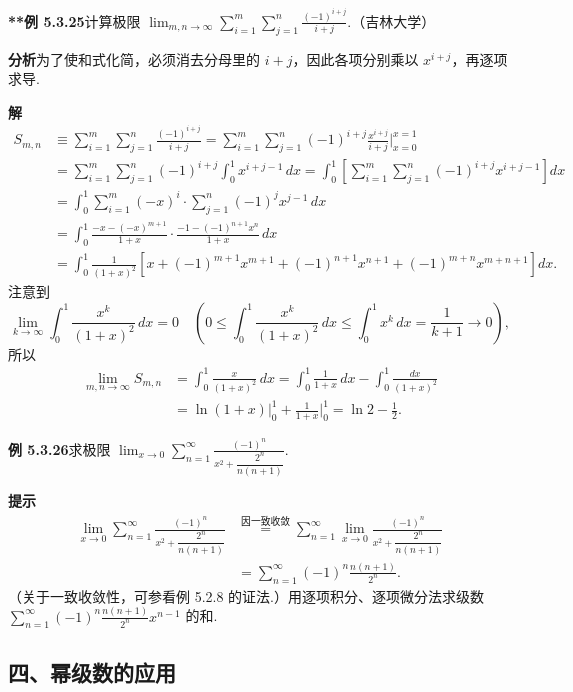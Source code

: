 \documentclass[UTF8, 12pt, fontset=fandol, oneside]{ctexart}
\begin{document}
\noindent\textbf{**例 5.3.25}\quad 计算极限
$\displaystyle\lim_{m,n\to\infty}\sum_{i=1}^m\sum_{j=1}^n\frac{(-1)^{i+j}}{i+j}$.（吉林大学）

\noindent\textbf{分析}\quad 为了使和式化简，必须消去分母里的 $i+j$，因此各项分别乘以 $x^{i+j}$，再逐项求导.

\noindent\textbf{解}\quad
\[
\begin{aligned}
S_{m,n}
&\equiv\sum_{i=1}^m\sum_{j=1}^n\frac{(-1)^{i+j}}{i+j}
=\sum_{i=1}^m\sum_{j=1}^n(-1)^{i+j}\frac{x^{i+j}}{i+j}\bigg|_{x=0}^{x=1}\\
&=\sum_{i=1}^m\sum_{j=1}^n(-1)^{i+j}\int_0^1 x^{i+j-1}\,dx
=\int_0^1\left[\sum_{i=1}^m\sum_{j=1}^n(-1)^{i+j}x^{i+j-1}\right]dx\\
&=\int_0^1\sum_{i=1}^m(-x)^i\cdot\sum_{j=1}^n(-1)^jx^{j-1}\,dx\\
&=\int_0^1\frac{-x-(-x)^{m+1}}{1+x}\cdot\frac{-1-(-1)^{n+1}x^n}{1+x}\,dx\\
&=\int_0^1\frac1{(1+x)^2}\left[x+(-1)^{m+1}x^{m+1}
+(-1)^{n+1}x^{n+1}+(-1)^{m+n}x^{m+n+1}\right]dx.
\end{aligned}
\]
注意到
\[
  \lim_{k\to\infty}\int_0^1\frac{x^k}{(1+x)^2}\,dx=0
  \quad\left(0\le\int_0^1\frac{x^k}{(1+x)^2}\,dx\le\int_0^1x^k\,dx=\frac1{k+1}\to0\right),
\]
所以
\[
\begin{aligned}
\lim_{m,n\to\infty}S_{m,n}
&=\int_0^1\frac{x}{(1+x)^2}\,dx
=\int_0^1\frac1{1+x}\,dx-\int_0^1\frac{dx}{(1+x)^2}\\
&=\ln(1+x)\bigg|_0^1+\frac1{1+x}\bigg|_0^1
=\ln2-\frac12.
\end{aligned}
\]

\noindent\textbf{例 5.3.26}\quad 求极限
$\displaystyle\lim_{x\to0}\sum_{n=1}^{\infty}\frac{(-1)^n}{x^2+\dfrac{2^n}{n(n+1)}}$.

\noindent\textbf{提示}\quad
\[
\begin{aligned}
\lim_{x\to0}\sum_{n=1}^{\infty}\frac{(-1)^n}{x^2+\dfrac{2^n}{n(n+1)}}
&\overset{\text{因一致收敛}}{=}
\sum_{n=1}^{\infty}\lim_{x\to0}\frac{(-1)^n}{x^2+\dfrac{2^n}{n(n+1)}}\\
&=\sum_{n=1}^{\infty}(-1)^n\frac{n(n+1)}{2^n}.
\end{aligned}
\]
（关于一致收敛性，可参看例 5.2.8 的证法.）用逐项积分、逐项微分法求级数
$\displaystyle\sum_{n=1}^{\infty}(-1)^n\frac{n(n+1)}{2^n}x^{n-1}$ 的和.

\subsection*{四、幂级数的应用}
\end{document}
